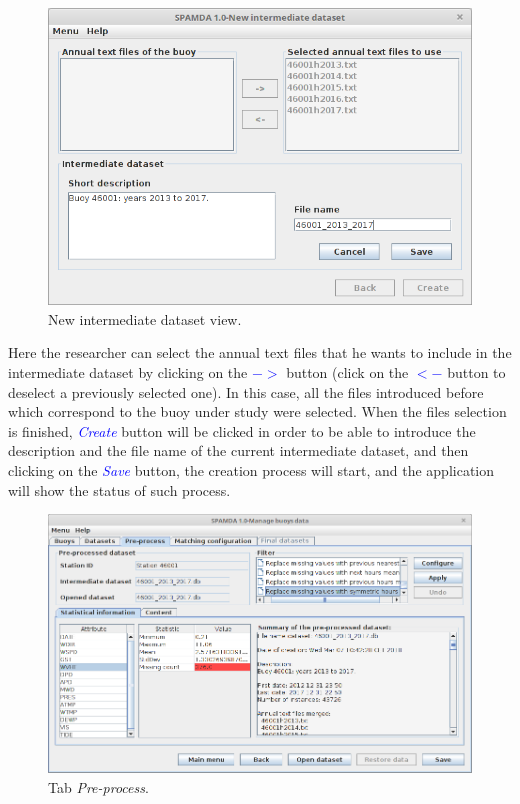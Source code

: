 \begin{onehalfspace}
			
			\begin{figure}[ht!]
				\centering
				\includegraphics[scale=0.43]{figures/creatingIntermediateDataset_CS.png}
				\caption{New intermediate dataset view.}\label{fig:intermediate}
			\end{figure}
			
			Here the researcher can select the annual text files that he wants to include in the intermediate dataset by clicking on the \textcolor{blue}{\textit{$-$$>$}} button (click on the \textcolor{blue}{\textit{$<$$-$}} button to deselect a previously selected one). In this case, all the files introduced before which correspond to the buoy under study were selected. When the files selection is finished, \textcolor{blue}{\textit{Create}} button will be clicked in order to be able to introduce the description and the file name of the current intermediate dataset, and then clicking on the \textcolor{blue}{\textit{Save}} button, the creation process will start, and the application will show the status of such process.
			
			\begin{figure}[ht!]
				\centering
				\includegraphics[scale=0.40]{figures/tabPreprocess_CS.png}
				\caption{Tab \textit{Pre-process}.}\label{fig:preprocess_data}
			\end{figure}
			

\end{onehalfspace}
